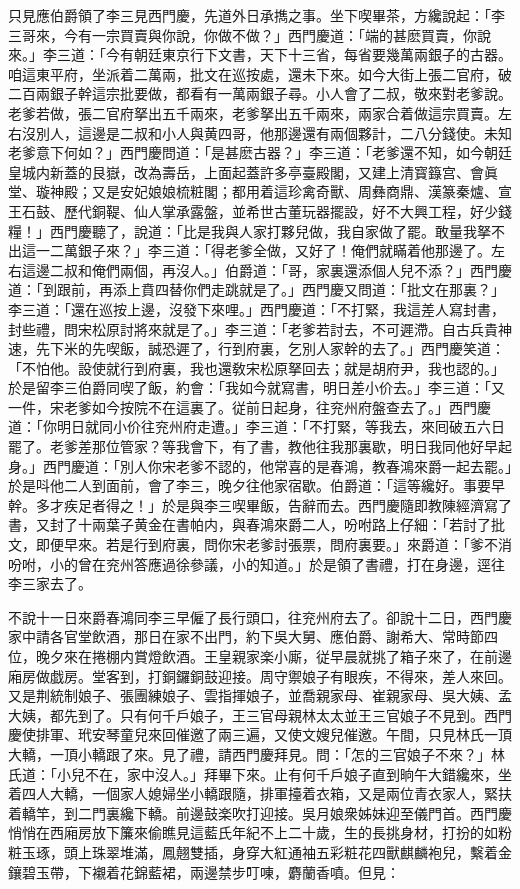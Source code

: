 只見應伯爵領了李三見西門慶，先道外日承擕之事。坐下喫畢茶，方纔說起：「李三哥來，今有一宗買賣與你說，你做不做？」西門慶道：「端的甚麽買賣，你說來。」李三道：「今有朝廷東京行下文書，天下十三省，每省要幾萬兩銀子的古器。咱這東平府，坐派着二萬兩，批文在巡按處，還未下來。如今大街上張二官府，破二百兩銀子幹這宗批要做，都看有一萬兩銀子尋。小人會了二叔，敬來對老爹說。老爹若做，張二官府拏出五千兩來，老爹拏出五千兩來，兩家合着做這宗買賣。左右沒別人，這邊是二叔和小人與黄四哥，他那邊還有兩個夥計，二八分錢使。未知老爹意下何如？」西門慶問道：「是甚麽古器？」李三道：「老爹還不知，如今朝廷皇城内新蓋的艮嶽，改為壽岳，上面起蓋許多亭臺殿閣，又建上清寳籙宫、會眞堂、璇神殿；又是安妃娘娘梳粧閣；都用着這珍禽奇獸、周彝商鼎、漢篆秦爐、宣王石鼓、歷代銅鞮、仙人掌承露盤，並希世古董玩器擺設，好不大興工程，好少錢糧！」西門慶聽了，說道：「比是我與人家打夥兒做，我自家做了罷。敢量我拏不出這一二萬銀子來？」李三道：「得老爹全做，又好了！俺們就瞞着他那邊了。左右這邊二叔和俺們兩個，再沒人。」伯爵道：「哥，家裏還添個人兒不添？」西門慶道：「到跟前，再添上賁四替你們走跳就是了。」西門慶又問道：「批文在那裏？」李三道：「還在巡按上邊，沒發下來哩。」西門慶道：「不打緊，我這差人寫封書，封些禮，問宋松原討將來就是了。」李三道：「老爹若討去，不可遲滯。自古兵貴神速，先下米的先喫飯，誠恐遲了，行到府裏，乞別人家幹的去了。」西門慶笑道：「不怕他。設使就行到府裏，我也還敎宋松原拏回去；就是胡府尹，我也認的。」於是留李三伯爵同喫了飯，約會：「我如今就寫書，明日差小价去。」李三道：「又一件，宋老爹如今按院不在這裏了。従前日起身，往兖州府盤查去了。」西門慶道：「你明日就同小价往兖州府走遭。」李三道：「不打緊，等我去，來囘破五六日罷了。老爹差那位管家？等我會下，有了書，教他往我那裏歇，明日我同他好早起身。」西門慶道：「別人你宋老爹不認的，他常喜的是春鴻，教春鴻來爵一起去罷。」於是呌他二人到面前，會了李三，晚夕往他家宿歇。伯爵道：「這等纔好。事要早幹。多才疾足者得之！」於是與李三喫畢飯，告辭而去。西門慶隨即教陳經濟寫了書，又封了十兩葉子黄金在書帕内，與春鴻來爵二人，吩咐路上仔細：「若討了批文，即便早來。若是行到府裏，問你宋老爹討張票，問府裏要。」來爵道：「爹不消吩咐，小的曾在兖州答應過徐參議，小的知道。」於是領了書禮，打在身邊，逕往李三家去了。

不說十一日來爵春鴻同李三早僱了長行頭口，往兖州府去了。卻說十二日，西門慶家中請各官堂飲酒，那日在家不出門，約下吳大舅、應伯爵、謝希大、常時節四位，晚夕來在捲棚内賞燈飲酒。王皇親家楽小廝，従早晨就挑了箱子來了，在前邊廂房做戯房。堂客到，打銅鑼銅鼓迎接。周守禦娘子有眼疾，不得來，差人來回。又是荆統制娘子、張團練娘子、雲指揮娘子，並喬親家母、崔親家母、吳大姨、孟大姨，都先到了。只有何千戶娘子，王三官母親林太太並王三官娘子不見到。西門慶使排軍、玳安琴童兒來回催邀了兩三遍，又使文嫂兒催邀。午間，只見林氏一頂大轎，一頂小轎跟了來。見了禮，請西門慶拜見。問：「怎的三官娘子不來？」林氏道：「小兒不在，家中沒人。」拜畢下來。止有何千戶娘子直到晌午大錯纔來，坐着四人大轎，一個家人媳婦坐小轎跟隨，排軍擡着衣箱，又是兩位青衣家人，緊扶着轎竿，到二門裏纔下轎。前邊鼓楽吹打迎接。吳月娘衆姊妹迎至儀門首。西門慶悄悄在西廂房放下簾來偷瞧見這藍氏年紀不上二十歲，生的長挑身材，打扮的如粉粧玉琢，頭上珠翠堆滿，鳳翹雙插，身穿大紅通袖五彩粧花四獸麒麟袍兒，繫着金鑲碧玉帶，下襯着花錦藍裙，兩邊禁步叮㖦，麝蘭香噴。但見：

